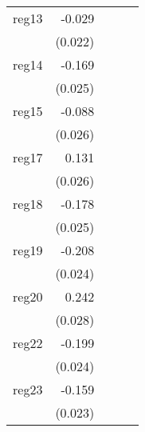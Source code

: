 {\begin{longtable}{l*{4}{D{.}{.}{-1}}}
\addlinespace
reg13       &      -0.029         &                     &                     &                     \\
            &     (0.022)         &                     &                     &                     \\
\addlinespace
reg14       &      -0.169\sym{***}&                     &                     &                     \\
            &     (0.025)         &                     &                     &                     \\
\addlinespace
reg15       &      -0.088\sym{***}&                     &                     &                     \\
            &     (0.026)         &                     &                     &                     \\
\addlinespace
reg17       &       0.131\sym{***}&                     &                     &                     \\
            &     (0.026)         &                     &                     &                     \\
\addlinespace
reg18       &      -0.178\sym{***}&                     &                     &                     \\
            &     (0.025)         &                     &                     &                     \\
\addlinespace
reg19       &      -0.208\sym{***}&                     &                     &                     \\
            &     (0.024)         &                     &                     &                     \\
\addlinespace
reg20       &       0.242\sym{***}&                     &                     &                     \\
            &     (0.028)         &                     &                     &                     \\
\addlinespace
reg22       &      -0.199\sym{***}&                     &                     &                     \\
            &     (0.024)         &                     &                     &                     \\
\addlinespace
reg23       &      -0.159\sym{***}&                     &                     &                     \\
            &     (0.023)         &                     &                     &                     \\

\end{longtable}}
